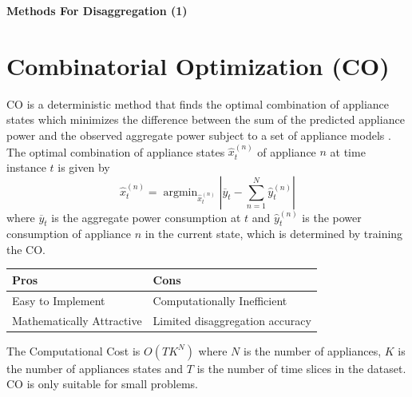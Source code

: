 \documentclass[landscape,fontscale=0.48,margin=2cm,paperwidth=135truecm,paperheight=89truecm]{baposter}
\begin{document}
\begin{poster}
\begin{posterbox}[column=1, height = bottom]{\LARGE \bfseries Methods For Disaggregation (1)}
\section*{Combinatorial Optimization (CO)}
CO is a deterministic method that finds the optimal combination of appliance states which minimizes the difference between the sum of the predicted appliance power and the observed aggregate power subject to a set of appliance models \cite{NILMTK}. The optimal combination of appliance states $\hat{x}^{(n)}_t$ of appliance $n$ at time instance $t$ is given by \cite{Hart}
%
\begin{equation}
\hat{x}^{(n)}_t=\mathop{\mathrm{argmin}}_{\hat{x}^{(n)}_t}\left|\overline{y}_t-\sum_{n=1}^N{\hat{y}_t^{(n)}}\right|
\end{equation}
%
where $\overline{y}_t$ is the aggregate power consumption at $t$ and $\hat{y}_t^{(n)}$ is the power consumption of appliance $n$ in the current state, which is determined by training the CO.

\vspace{1em}
\begin{tabularx}{\linewidth}{X|X}
  \hline
  \bf Pros & \bf Cons \\
  \hline
  \small Easy to Implement & \small Computationally Inefficient\\
  \small Mathematically Attractive & \small Limited disaggregation accuracy\\
  \hline
\end{tabularx}


\vspace{6pt}
The Computational Cost is $O(TK^N)$ where $N$ is the number of appliances, $K$ is the number of appliances states and $T$ is the number of time slices in the dataset. CO is only suitable for small problems.



\end{posterbox}
\end{poster}
\end{document}
